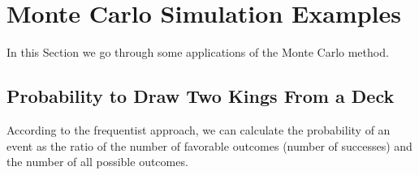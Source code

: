 %
%
%

\section{Monte Carlo Simulation Examples}
\label{example-of-monte-carlo-simulation}

In this Section we go through some applications of the Monte Carlo method.

\subsection{Probability to Draw Two Kings From a Deck}
According to the frequentist approach, we can calculate the probability of an event as the ratio of the number of favorable outcomes (number of successes) and the number of all possible outcomes. 

